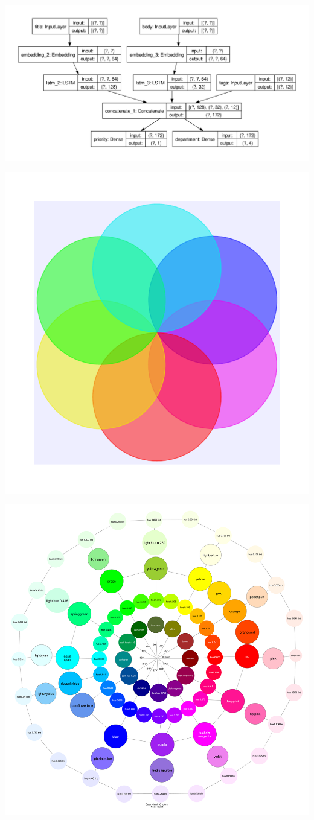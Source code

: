 \documentclass{article}
\begin{document}
\includegraphics[width=.75\linewidth]{fig-1.pdf}

\includegraphics[width=.75\linewidth]{fig-2.pdf}

\includegraphics[width=.75\linewidth]{fig-3.pdf}
\end{document}
